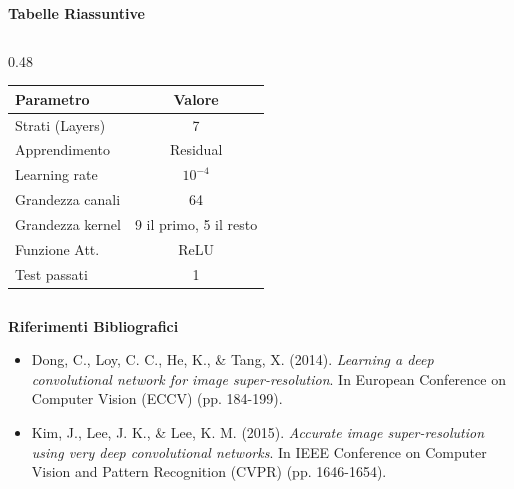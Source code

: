 \documentclass[aspectratio=169]{beamer}
\begin{document}
\begin{frame}{\textbf{Tabelle Riassuntive}}
\begin{columns}[t]
\begin{column}{0.48\textwidth}
            \begin{tabular}{|l|c|}
                \hline
                \textbf{Parametro} & \textbf{Valore} \\ \hline
                Strati (Layers)    & 7               \\ \hline
                Apprendimento      & Residual        \\ \hline
                Learning rate      & $10^{-4}$ \\ \hline
                Grandezza canali   & 64              \\ \hline
                Grandezza kernel   & 9 il primo, 5 il resto          \\ \hline
                Funzione Att.      & ReLU            \\ \hline
                Test passati       & 1               \\ \hline
            \end{tabular}
        \end{column}

    \end{columns}
\end{frame}

\begin{frame}{\textbf{Riferimenti Bibliografici}}
    \begin{itemize}
        \setlength{\itemsep}{0.8em} %

        \item Dong, C., Loy, C. C., He, K., \& Tang, X. (2014).
        \textit{Learning a deep convolutional network for image super-resolution}.
        In European Conference on Computer Vision (ECCV) (pp. 184-199).

        \item Kim, J., Lee, J. K., \& Lee, K. M. (2015).
        \textit{Accurate image super-resolution using very deep convolutional networks}.
        In IEEE Conference on Computer Vision and Pattern Recognition (CVPR) (pp. 1646-1654).
    \end{itemize}
\end{frame}
\end{document}
